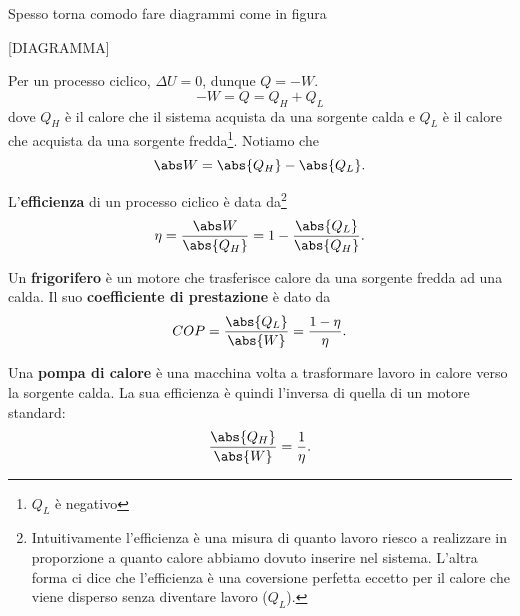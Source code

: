 \begin{remark}
Spesso torna comodo fare diagrammi come in figura

[DIAGRAMMA]
\end{remark}

\begin{remark}
Per un processo ciclico, $\Delta U=0$, dunque $Q=-W$.
\[-W=Q=Q_H+Q_L\]
dove $Q_H$ \`e il calore che il sistema acquista da una sorgente calda e $Q_L$ \`e il calore che acquista da una sorgente fredda\footnote{$Q_L$ \`e negativo}. Notiamo che
\[\abs W=\abs{Q_H}-\abs{Q_L}.\]
\end{remark}

\begin{definition}[Efficienza]
L'\textbf{efficienza} di un processo ciclico \`e data da\footnote{Intuitivamente l'efficienza \`e una misura di quanto lavoro riesco a realizzare in proporzione a quanto calore abbiamo dovuto inserire nel sistema. L'altra forma ci dice che l'efficienza \`e una coversione perfetta eccetto per il calore che viene disperso senza diventare lavoro ($Q_L$).}
\[\eta=\frac{\abs W}{\abs{Q_H}}=1-\frac{\abs{Q_L}}{\abs{Q_H}}.\]
\end{definition}

\begin{definition}
Un \textbf{frigorifero} \`e un motore che trasferisce calore da una sorgente fredda ad una calda. Il suo \textbf{coefficiente di prestazione} \`e dato da
\[COP=\frac{\abs{Q_L}}{\abs{W}}=\frac{1-\eta}\eta.\]
\end{definition}

\begin{definition}
Una \textbf{pompa di calore} \`e una macchina volta a trasformare lavoro in calore verso la sorgente calda. La sua efficienza \`e quindi l'inversa di quella di un motore standard:
\[\frac{\abs{Q_H}}{\abs{W}}=\frac1\eta.\]
\end{definition}


